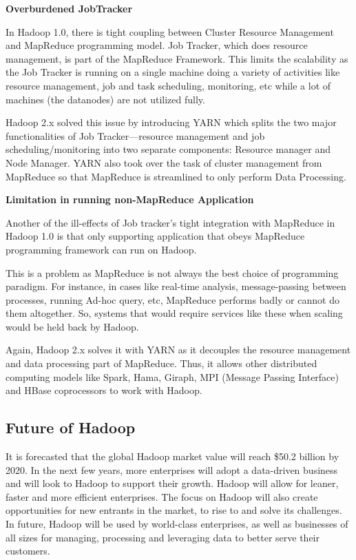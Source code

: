 \documentclass[a4paper,12pt,oneside]{report}
\begin{document}
\textbf{Overburdened JobTracker}

In Hadoop 1.0, there is tight coupling between Cluster Resource Management and MapReduce programming model. 
Job Tracker, which does resource management, is part of the MapReduce Framework. 
This limits the scalability as the Job Tracker is running on a single machine doing a variety of activities like 
resource management, job and task scheduling, monitoring, etc while a lot of machines (the datanodes) are not utilized fully.

Hadoop 2.x solved this issue by introducing YARN which splits the two major functionalities of Job Tracker—resource 
management and job scheduling/monitoring into two separate components: Resource manager and Node Manager. 
YARN also took over the task of cluster management from MapReduce so that MapReduce is streamlined to only perform Data Processing.

\textbf{Limitation in running non-MapReduce Application}

Another of the ill-effects of Job tracker’s tight integration with MapReduce in Hadoop 1.0 is that only supporting application 
that obeys MapReduce programming framework can run on Hadoop. 

This is a problem as MapReduce is not always the best choice of programming paradigm. 
For instance, in cases like real-time analysis, message-passing between processes, running Ad-hoc query, etc, 
MapReduce performs badly or cannot do them altogether. So, systems that would require services like these when scaling 
would be held back by Hadoop. 

Again, Hadoop 2.x solves it with YARN as it decouples the resource management and data processing part of MapReduce. 
Thus, it allows other distributed computing models like Spark, Hama, Giraph, MPI (Message Passing Interface) and HBase 
coprocessors to work with Hadoop. 

\subsection{Future of Hadoop}

It is forecasted that the global Hadoop market value will reach \$50.2 billion 
by 2020. In the next few years, more enterprises will adopt a data-driven 
business and will look to Hadoop to support their growth. Hadoop will allow 
for leaner, faster and more efficient enterprises. The focus on Hadoop will 
also create opportunities for new entrants in the market, to rise to and solve 
its challenges. In future, Hadoop will be used by world-class enterprises, 
as well as businesses of all sizes for managing, processing and leveraging 
data to better serve their customers.
\end{document}
